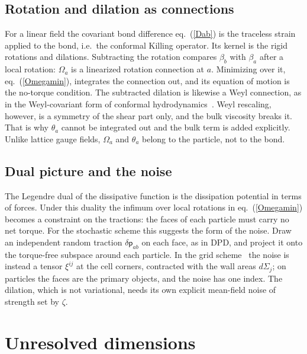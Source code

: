 \documentclass[11pt,aps,preprint,nofootinbib,superscriptaddress,tightenlines]{revtex4-2}
\def\Eq#1{eq.~(\ref{#1})}
\newcommand{\pf}{\bm{\mathsf p}}
\begin{document}
\subsection{Rotation and dilation as connections}

For a linear field the covariant bond difference \Eq{Dab} is the traceless
strain applied to the bond, i.e.\ the conformal Killing operator.  Its kernel is the rigid rotations and dilations.  Subtracting the rotation compares $\beta_b$ with $\beta_a$ after a local rotation:
$\Omega_a$ is a linearized rotation connection at $a$.  Minimizing over it,
\Eq{Omegamin}, integrates the connection out, and its equation of motion is the
no-torque condition.  The subtracted dilation is likewise a Weyl
connection, as in the Weyl-covariant form of conformal
hydrodynamics~\cite{Loganayagam2008}.  Weyl rescaling, however, is a symmetry of
the shear part only, and the bulk viscosity breaks it.  That is why $\theta_a$
cannot be integrated out and the bulk term is added explicitly.  Unlike
lattice gauge fields, $\Omega_a$ and $\theta_a$ belong to the particle, not to
the bond.

\subsection{Dual picture and the noise}

The Legendre dual of the dissipative function is the dissipation potential in
terms of forces.  Under this duality the infimum over local rotations in
\Eq{Omegamin} becomes a constraint on the tractions: the faces of each
particle must carry no net torque.  For the stochastic scheme this suggests the
form of the noise.  Draw an independent random traction $\delta\pf_{ab}$ on each
face, as in DPD, and project it onto the torque-free subspace around each
particle.  In the grid scheme~\cite{BhambureSinghTeaney2025} the noise is instead a
tensor $\xi^{ij}$ at the cell corners, contracted with the wall areas
$d\Sigma_j$; on particles the faces are the primary objects, and the noise has
one index.  The dilation, which is not variational, needs its own explicit mean-field noise of
strength set by $\zeta$.


\section{Unresolved dimensions}
\label{sec:unresolved}
\end{document}
